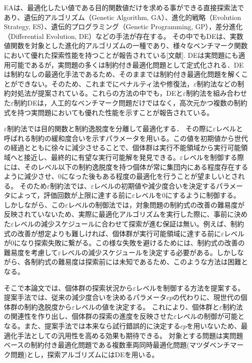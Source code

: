 \documentclass[a4paper,12pt]{jsreport}
\begin{document}
EAは、最適化したい値である目的関数値だけを求める事ができる直接探索法であり、遺伝的アルゴリズム（Genetic Algorithm, GA）、進化的戦略（Evolution Strategy, ES）、遺伝的プログラミング（Genetic Programming, GP），差分進化（Differential Evolution, DE）\cite{DE1}などの手法が存在する。
その中でもDEは、実数値関数を対象とした進化的アルゴリズムの一種であり、様々なベンチマーク関数において優れた探索性能を持つことが報告されている[文献].
DEは実問題にも適用可能であるが，実問題の多くは制約付き最適化問題として定式化される．DEは制約なしの最適化手法であるため、そのままでは制約付き最適化問題を解くことができない。そのため、これまでにペナルティ法や修復法，$\varepsilon$制約法などの制約対処法が提案されている。これらの方法の中でも，DEと$\varepsilon$制約法を組み合わせた$\varepsilon$制約DE\cite{先行研究}は，人工的なベンチマーク問題だけではなく，高次元かつ複数の制約式を持つ実問題においても優れた性能を示すことが報告されている\cite{εDE}。

$\varepsilon$制約法では目的関数と制約逸脱度を分離して最適化する．
その際に$\varepsilon$レベルと呼ばれる制約の緩和度合いを示すパラメータを用いる。この値を初期値から世代の経過とともに徐々に減少させることで、個体群は実行不能領域から実行可能領域へと接近し、最終的に有望な実行可能解を発見できる。$\varepsilon$レベルを制御する際には、そのレベル以下の制約逸脱度を持つ個体が常に集団内にある程度存在するように減少させ、0になった後もある程度の最適化を行うことが望ましいとされる\cite{εレベル制御}。
そのため$\varepsilon$制約法では、$\varepsilon$レベルの初期値や減少度合いを決定するパラメータによって，評価回数が上限に達する前に$\varepsilon$レベルを0にするように制御する。
しかしながら、この$\varepsilon$レベルの制御法では，対象問題の制約式の改善の難易度が反映されていないため、実際に最適化アルゴリズムを実行した際に、事前に決めた$\varepsilon$レベルの減少スケジュールに合わせて探索が進む保証は無い。例えば、制約式の改善が想定よりも難しければ、個体群が実行可能領域に達する前に$\varepsilon$レベルが0になり探索失敗に繋がる。この様な失敗を避けるためには、制約式の改善の難易度を考慮して$\varepsilon$レベルの減少スケジュールを決定する必要がある。しかしながら、各制約式の難易度は探索前には未知であるため、このような方法は困難となる。

そこで本論文では、個体群の探索状況から$\varepsilon$レベルを制御する方法を提案する。提案手法では、従来の減少度合いを決めるパラメータ$cp$の代わりに、現世代の個体群の制約逸脱度から$\varepsilon$レベルの値を決定する。
これにより、個体群と$\varepsilon$制約法の関連性を作り出し、個体群の探索の進度を反映させた$\varepsilon$レベルの制御が可能となる。また、提案手法では本来なら試行錯誤的に決定する$cp$を用いないため、最適化手法としての汎用性を高める効果も期待できる。
対象とする問題は実問題ベースの制約付き最適化問題である複数車両同時最適化問題(マツダベンチマーク問題)\cite{マツダベンチマーク問題}とし，探索アルゴリズムにはDEを用いる。
\end{document}
